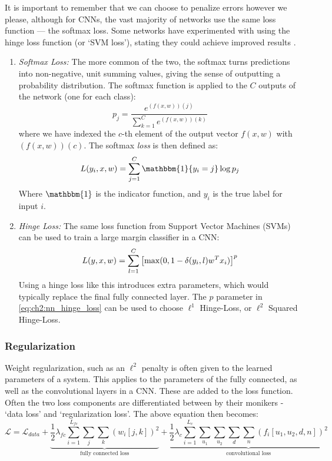   It is important to remember that we can choose
  to penalize errors however we please, although for CNNs, the vast majority of
  networks use the same loss function --- the softmax loss. Some networks have
  experimented with using the hinge loss function (or `SVM loss'), stating they
  could achieve improved results \citep{gu_recent_2015,tang_deep_2013}. 
  \begin{enumerate}

  \item \emph{Softmax Loss:} The more common of the two, the softmax turns
    predictions into non-negative, unit summing values, giving the sense of
    outputting a probability distribution. The softmax function is applied to
    the $C$ outputs of the network (one for each class):
    \begin{equation}
      p_j = \frac{e^{(f(x, w))(j)}}{\sum\limits_{k=1}^{C}e^{(f(x,w))(k)}}
    \end{equation}
    where we have indexed the $c$-th element of the output vector $f(x,w)$ with
      $(f(x,w))(c)$. The softmax \emph{loss} is then defined as:
    \begin{equation}
      \loss (y_i, x, w)
      = \sum_{j=1}^{C} \mathbbm{1}\{y_i=j\} \log p_j
    \end{equation}
    Where $\mathbbm{1}$ is the indicator function, and $y_i$ is the true label
    for input $i$.

  \item \emph{Hinge Loss:} The same loss function from Support Vector
    Machines (SVMs) can be used to train a large margin classifier in a CNN:
    \begin{equation}
      L(y,x,w) = \sum_{l=1}^{C} 
        {\left[ \max(0, 1 - \delta(y_i,l) w^{T}x_{i}) \right]}^p \label{eq:ch2:nn_hinge_loss}
    \end{equation}
    Using a hinge loss like this introduces extra parameters, which would
    typically replace the final fully connected layer. The $p$ parameter in
    \autoref{eq:ch2:nn_hinge_loss} can be used to choose $\ell^1$ Hinge-Loss, or
    $\ell^2$ Squared Hinge-Loss. 

  \end{enumerate}
  

\subsubsection{Regularization}
  Weight regularization, such as an $\ell^2$ penalty is often given to the
  learned parameters of a system. This applies to the parameters of the fully
  connected, as well as the convolutional layers in a CNN\@. These are added to
  the loss function. Often the two loss components are differentiated between by
  their monikers - `data loss' and `regularization loss'. The above 
  equation then becomes:
  \begin{equation}
    \mathcal{L} = \mathcal{L}_{data} + \underbrace{\frac{1}{2}\lambda_{fc}
    \sum_{i=1}^{L_{fc}} \sum_{j} \sum_{k} {(w_{i}[j,k])}^2}_{\text{fully connected
    loss}} +
    \underbrace{\frac{1}{2}\lambda_{c} \sum_{i=1}^{L_c} \sum_{u_1} \sum_{u_2} \sum_{d}
    \sum_{n} \left(f_i[u_1,u_2,d,n]\right)^2}_{\text{convolutional loss}}
  \end{equation}

